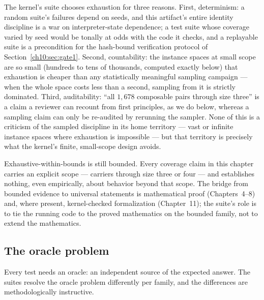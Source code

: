 The kernel's suite chooses exhaustion for three reasons. First,
determinism: a random suite's failures depend on seeds, and this artifact's
entire identity discipline is a war on interpreter-state dependence; a
test suite whose coverage varied by seed would be tonally at odds with the
code it checks, and a replayable suite is a precondition for the
hash-bound verification protocol of Section~\ref{ch10:sec:gate1}. Second,
countability: the instance spaces at small scope are so small (hundreds to
tens of thousands, computed exactly below) that exhaustion is cheaper than
any statistically meaningful sampling campaign --- when the whole space
costs less than a second, sampling from it is strictly dominated. Third,
auditability: ``all $1{,}678$ composable pairs through size three'' is a
claim a reviewer can recount from first principles, as we do below,
whereas a sampling claim can only be re-audited by rerunning the sampler.
None of this is a criticism of the sampled discipline in its home
territory --- vast or infinite instance spaces where exhaustion is
impossible --- but that territory is precisely what the kernel's finite,
small-scope design avoids.

\begin{boundary}\label{ch10:bdy:scope}
Exhaustive-within-bounds is still bounded. Every coverage claim in this
chapter carries an explicit scope --- carriers through size three or four
--- and establishes nothing, even empirically, about behavior beyond that
scope. The bridge from bounded evidence to universal statements is
mathematical proof (Chapters~4--8) and, where present, kernel-checked
formalization (Chapter~11); the suite's role is to tie the running code to
the proved mathematics on the bounded family, not to extend the
mathematics.
\end{boundary}

\subsection{The oracle problem}

Every test needs an oracle: an independent source of the expected answer.
The suites resolve the oracle problem differently per family, and the
differences are methodologically instructive.

